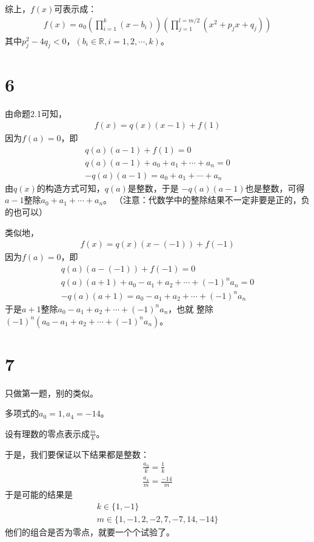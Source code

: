 \documentclass{article}
\begin{document}
综上，$f(x)$可表示成：
\begin{align*}
  f(x) = a_0\left(\prod\limits_{i = 1}^k (x - b_i)\right)
  \left(\prod\limits_{j = 1}^{l = m/2} (x^2 + p_j x + q_j)\right)
\end{align*}
其中$p_j^2 - 4q_j < 0$，$(b_i \in \mathbb{R}, i = 1, 2, \cdots, k)$。

\section*{6}

由命题2.1可知，
\begin{align*}
  f(x) = q(x)(x - 1) + f(1)
\end{align*}
因为$f(a) = 0$，即
\begin{align*}
  q(a)(a - 1) + f(1) = 0                     \\
  q(a)(a - 1) + a_0 + a_1 + \cdots + a_n = 0 \\
  - q(a)(a - 1) = a_0 + a_1 + \cdots + a_n
\end{align*}
由$q(x)$的构造方式可知，$q(a)$是整数，于是
$-q(a)(a - 1)$也是整数，可得$a - 1$整除$a_0 + a_1 + \cdots + a_n$。
（注意：代数学中的整除结果不一定非要是正的，负的也可以）

类似地，
\begin{align*}
  f(x) = q(x)(x - (-1)) + f(-1)
\end{align*}
因为$f(a) = 0$，即
\begin{align*}
  q(a)(a-(-1)) + f(-1) = 0                                \\
  q(a)(a + 1) + a_0 - a_1 + a_2 + \cdots + (-1)^n a_n = 0 \\
  - q(a)(a + 1) = a_0 - a_1 + a_2 + \cdots + (-1)^n a_n
\end{align*}
于是$a+1$整除$a_0 - a_1 + a_2 + \cdots + (-1)^n a_n$，也就
整除$(-1)^n (a_0 - a_1 + a_2 + \cdots + (-1)^n a_n)$。

\section*{7}
只做第一题，别的类似。

多项式的$a_0 = 1, a_4 = -14$。

设有理数的零点表示成$\frac{m}{k}$。

于是，我们要保证以下结果都是整数：
\begin{align*}
  \frac{a_0}{k} = \frac{1}{k} \\
  \frac{a_4}{m} = \frac{-14}{m}
\end{align*}
于是可能的结果是
\begin{align*}
  k \in \{1, -1\} \\
  m \in \{1, -1, 2, -2, 7, -7, 14, -14\}
\end{align*}
他们的组合是否为零点，就要一个个试验了。
\end{document}
